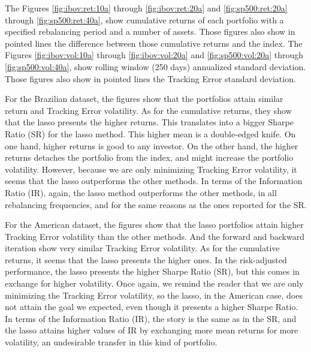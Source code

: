 \documentclass[12pt,oneside,a4paper]{memoir}
\begin{document}
The Figures \ref{fig:ibov:ret:10a} through \ref{fig:ibov:ret:20a} and \ref{fig:sp500:ret:20a} through \ref{fig:sp500:ret:40a}, show cumulative returns of each portfolio with a specified rebalancing period and a number of assets.
Those figures also show in pointed lines the difference between those cumulative returns and the index.
The Figures \ref{fig:ibov:vol:10a} through \ref{fig:ibov:vol:20a} and \ref{fig:sp500:vol:20a} through \ref{fig:sp500:vol:40a}, show rolling window (250 days) annualized standard deviation.
Those figures also show in pointed lines the Tracking Error standard deviation.

For the Brazilian dataset, the figures show that the portfolios attain similar return and Tracking Error volatility.
As for the cumulative returns, they show that the lasso presents the higher returns.
This translates into a bigger Sharpe Ratio (SR) for the lasso method.
This higher mean is a double-edged knife.
On one hand, higher returns is good to any investor.
On the other hand, the higher returns detaches the portfolio from the index, and might increase the portfolio volatility.
However, because we are only minimizing Tracking Error volatility, it seems that the lasso outperforms the other methods.
In terms of the Information Ratio (IR), again, the lasso method outperforms the other methods, in all rebalancing frequencies, and for the same reasons as the ones reported for the SR.

For the American dataset, the figures show that the lasso portfolios attain higher Tracking Error volatility than the other methods.
And the forward and backward iteration show very similar Tracking Error volatility.
As for the cumulative returns, it seems that the lasso presents the higher ones.
In the risk-adjusted performance, the lasso presents the higher Sharpe Ratio (SR), but this comes in exchange for higher volatility.
Once again, we remind the reader that we are only minimizing the Tracking Error volatility, so the lasso, in the American case, does not attain the goal we expected, even though it presents a higher Sharpe Ratio.
In terms of the Information Ratio (IR), the story is the same as in the SR, and the lasso attains higher values of IR by exchanging more mean returns for more volatility, an undesirable transfer in this kind of portfolio.
\end{document}
